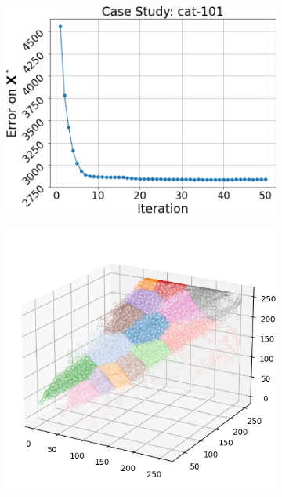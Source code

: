 \begin{figure}[htbp]
\begin{subfigure}[t]{0.32\textwidth}
        \includegraphics[width=\linewidth]{../../python_code/plots/kmeans/cat-101/elbow_curve.png}
    \end{subfigure}
    \begin{subfigure}[t]{0.32\textwidth}
        \includegraphics[width=\linewidth]{../../python_code/plots/kmeans/cat-101/clusters_elev20_azim-60.png}
    \end{subfigure}
    \begin{subfigure}[t]{0.32\textwidth}

\end{subfigure}
\end{figure}
